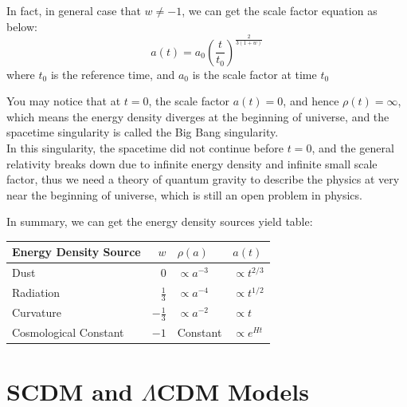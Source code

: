 \bigskip \noindent
\begin{theory}
    In fact, in general case that $w \neq -1$, we can get the scale factor equation as below:
    \[
        a(t) = a_0 \left( \frac{t}{t_0} \right)^{\frac{2}{3(1+w)}}
    \]
    where $t_0$ is the reference time, and $a_0$ is the scale factor at time $t_0$
\end{theory}

\begin{remark}
    You may notice that at $t = 0$, the scale factor $a(t) = 0$, and hence $\rho(t) = \infty$, which means the energy density diverges at the beginning of universe, and the spacetime singularity is called the Big Bang singularity. \\

    In this singularity, the spacetime did not continue before $t = 0$, and the general relativity breaks down due to infinite energy density and infinite small scale factor, thus we need a theory of quantum gravity to describe the physics at very near the beginning of universe, which is still an open problem in physics. \\
\end{remark}

\bigskip \noindent
\begin{theory}
    In summary, we can get the energy density sources yield table:
    \begin{center}
        \begin{tabular}{p{5.5cm}| r | l| l}
            \hline
            \textbf{Energy Density Source} & \textbf{$w$} & \textbf{$\rho(a)$} & \textbf{$a(t)$} \\
            \hline
            Dust & $0$ & $\propto a^{-3}$ & $\propto t^{2/3}$ \\
            Radiation & $\frac{1}{3}$ & $\propto a^{-4}$ & $\propto t^{1/2}$ \\
            Curvature & $-\frac{1}{3}$ & $\propto a^{-2}$ & $\propto t$ \\
            Cosmological Constant & $-1$ & Constant & $\propto e^{Ht}$
        \end{tabular}
    \end{center}
\end{theory}

\bigskip \noindent \bigskip \noindent \bigskip \noindent
\section{SCDM and \texorpdfstring{$\Lambda$}{Lambda}CDM Models}

